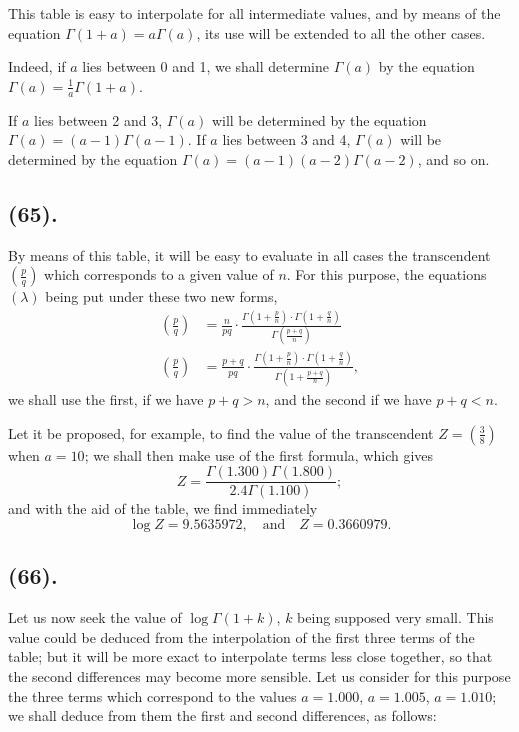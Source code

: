 \documentclass{article}
\begin{document}
This table is easy to interpolate for all intermediate values, and by means of the equation $\Gamma(1+a)=a\Gamma(a)$, its use will be extended to all the other cases.

Indeed, if $a$ lies between 0 and 1, we shall determine $\Gamma(a)$ by the equation $\Gamma(a)=\frac{1}{a}\Gamma(1+a)$.

If $a$ lies between 2 and 3, $\Gamma(a)$ will be determined by the equation $\Gamma(a)=(a-1)\Gamma(a-1)$. If $a$ lies between 3 and 4, $\Gamma(a)$ will be determined by the equation $\Gamma(a)=(a-1)(a-2)\Gamma(a-2)$, and so on.

\subsection*{(65).}

By means of this table, it will be easy to evaluate in all cases the transcendent $\left(\frac{p}{q}\right)$ which corresponds to a given value of $n$. For this purpose, the equations $(\lambda)$ being put under these two new forms,
\[ \begin{aligned} \left(\frac{p}{q}\right)&=\frac{n}{pq}\cdot\frac{\Gamma\left(1+\frac{p}{n}\right)\cdot\Gamma\left(1+\frac{q}{n}\right)}{\Gamma\left(\frac{p+q}{n}\right)}\\ \left(\frac{p}{q}\right)&=\frac{p+q}{pq}\cdot\frac{\Gamma\left(1+\frac{p}{n}\right)\cdot\Gamma\left(1+\frac{q}{n}\right)}{\Gamma\left(1+\frac{p+q}{n}\right)}, \end{aligned} \]
we shall use the first, if we have $p+q>n$, and the second if we have $p+q<n$.

Let it be proposed, for example, to find the value of the transcendent $Z=\left(\frac{3}{8}\right)$ when $a=10$; we shall then make use of the first formula, which gives
\[ Z=\frac{\Gamma(1.300)\Gamma(1.800)}{2.4\Gamma(1.100)}; \]
and with the aid of the table, we find immediately
\[ \log Z=9.5635972,\quad\text{and}\quad Z=0.3660979. \]

\subsection*{(66).}

Let us now seek the value of $\log\Gamma(1+k)$, $k$ being supposed very small. This value could be deduced from the interpolation of the first three terms of the table; but it will be more exact to interpolate terms less close together, so that the second differences may become more sensible. Let us consider for this purpose the three terms which correspond to the values $a=1.000$, $a=1.005$, $a=1.010$; we shall deduce from them the first and second differences, as follows:
\end{document}
